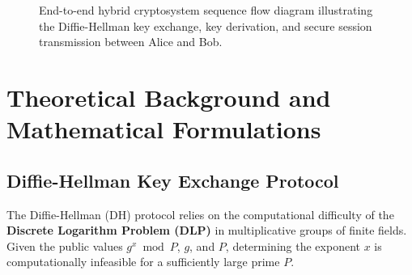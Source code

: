 \documentclass[11pt,a4paper]{article}
\begin{document}
\begin{figure}[H]
    \caption{End-to-end hybrid cryptosystem sequence flow diagram illustrating the Diffie-Hellman key exchange, key derivation, and secure session transmission between Alice and Bob.}
    \label{fig:seq_diag}
\end{figure}

\newpage

\section{Theoretical Background and Mathematical Formulations}

\subsection{Diffie-Hellman Key Exchange Protocol}
The Diffie-Hellman (DH) protocol relies on the computational difficulty of the \textbf{Discrete Logarithm Problem (DLP)} in multiplicative groups of finite fields. Given the public values $g^x \bmod P$, $g$, and $P$, determining the exponent $x$ is computationally infeasible for a sufficiently large prime $P$.
\end{document}
